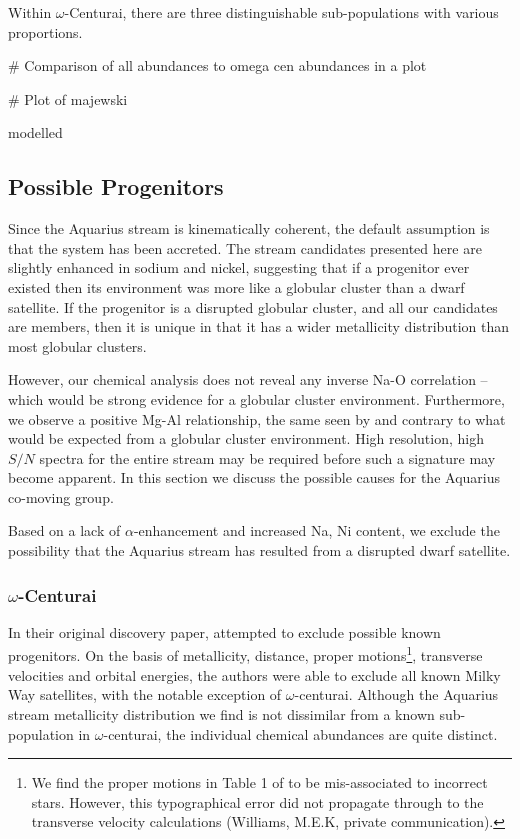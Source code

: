 \documentclass{emulateapj}
\begin{document}
Within $\omega$-Centurai, there are three distinguishable sub-populations with various proportions.

\# Comparison of all abundances to omega cen abundances in a plot

\# Plot of majewski 

\citet{majewski;et-al_2012} modelled 


\subsection{Possible Progenitors}

Since the Aquarius stream is kinematically coherent, the default assumption is that the system has been accreted. The stream candidates presented here are slightly enhanced in sodium and nickel, suggesting that if a progenitor ever existed then its environment was more like a globular cluster than a dwarf satellite. If the progenitor is a disrupted globular cluster, and all our candidates are members, then it is unique in that it has a wider metallicity distribution than most globular clusters.

However, our chemical analysis does not reveal any inverse Na-O correlation \--- which would be strong evidence for a globular cluster environment. Furthermore, we observe a positive Mg-Al relationship, the same seen by \citet{wylie-de-boer;et-al_2012} and contrary to what would be expected from a globular cluster environment. High resolution, high $S/N$ spectra for the entire stream may be required before such a signature may become apparent. In this section we discuss the possible causes for the Aquarius co-moving group.

Based on a lack of $\alpha$-enhancement and increased Na, Ni content, we exclude the possibility that the Aquarius stream has resulted from a disrupted dwarf satellite.

\subsubsection{$\omega$-Centurai}

In their original discovery paper, \citet{williams;et-al_2011} attempted to exclude possible known progenitors. On the basis of metallicity, distance, proper motions\footnote{We find the proper motions in Table 1 of \citet{williams;et-al_2011} to be mis-associated to incorrect stars. However, this typographical error did not propagate through to the transverse velocity calculations (Williams, M.E.K, private communication).}, transverse velocities and orbital energies, the authors were able to exclude all known Milky Way satellites, with the notable exception of $\omega$-centurai. Although the Aquarius stream metallicity distribution we find is not dissimilar from a known sub-population in $\omega$-centurai, the individual chemical abundances are quite distinct.
\end{document}
